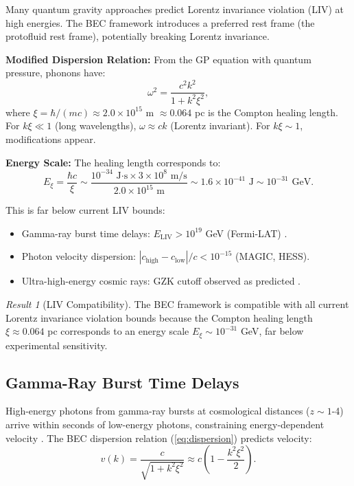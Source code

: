 \documentclass[11pt,a4paper]{article}
\theoremstyle{definition}
\theoremstyle{remark}
\newtheorem{result}[theorem]{Result}
\begin{document}
Many quantum gravity approaches predict Lorentz invariance violation (LIV) at high energies. The BEC framework introduces a preferred rest frame (the protofluid rest frame), potentially breaking Lorentz invariance.

\textbf{Modified Dispersion Relation:} From the GP equation with quantum pressure, phonons have:
\begin{equation}
\label{eq:dispersion}
\omega^2 = \frac{c^2 k^2}{1 + k^2 \xi^2},
\end{equation}
where $\xi = \hbar/(mc) \approx 2.0 \times 10^{15}$ m $\approx 0.064$ pc is the Compton healing length. For $k\xi \ll 1$ (long wavelengths), $\omega \approx c k$ (Lorentz invariant). For $k\xi \sim 1$, modifications appear.

\textbf{Energy Scale:} The healing length corresponds to:
\begin{equation}
E_\xi = \frac{\hbar c}{\xi} \sim \frac{10^{-34} \text{ J·s} \times 3 \times 10^8 \text{ m/s}}{2.0 \times 10^{15} \text{ m}} \sim 1.6 \times 10^{-41} \text{ J} \sim 10^{-31} \text{ GeV}.
\end{equation}

This is far below current LIV bounds:
\begin{itemize}
\item Gamma-ray burst time delays: $E_{\mathrm{LIV}} > 10^{19}$ GeV (Fermi-LAT) \cite{Fermi2009}.
\item Photon velocity dispersion: $|c_{\mathrm{high}} - c_{\mathrm{low}}|/c < 10^{-15}$ (MAGIC, HESS).
\item Ultra-high-energy cosmic rays: GZK cutoff observed as predicted \cite{Auger2008}.
\end{itemize}

\begin{result}[LIV Compatibility]
The BEC framework is compatible with all current Lorentz invariance violation bounds because the Compton healing length $\xi \approx 0.064$ pc corresponds to an energy scale $E_\xi \sim 10^{-31}$ GeV, far below experimental sensitivity.
\end{result}

\subsection{Gamma-Ray Burst Time Delays}
\label{sec:grb_delays}

High-energy photons from gamma-ray bursts at cosmological distances ($z \sim 1$-4) arrive within seconds of low-energy photons, constraining energy-dependent velocity \cite{Fermi2009}. The BEC dispersion relation (\ref{eq:dispersion}) predicts velocity:
\begin{equation}
v(k) = \frac{c}{\sqrt{1 + k^2\xi^2}} \approx c\left(1 - \frac{k^2\xi^2}{2}\right).
\end{equation}
\end{document}
